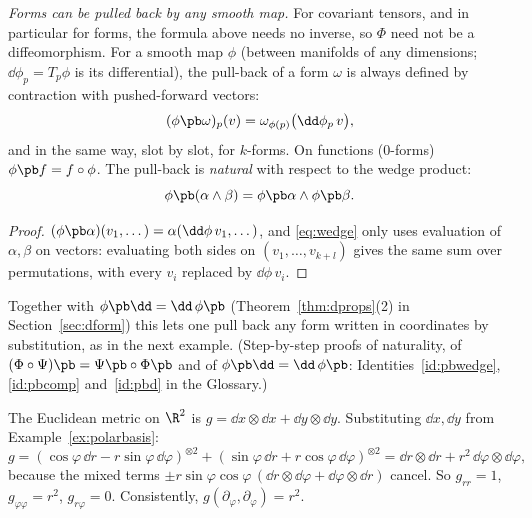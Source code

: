 \emph{Forms can be pulled back by any smooth map.} For covariant tensors, and in particular for forms, the formula above
needs no inverse, so $\Phi$ need not be a diffeomorphism. For a smooth map $\phi$ (between manifolds of any dimensions;
$\dd\phi_p=T_p\phi$ is its differential), the pull-back of a form $\omega$ is always defined by contraction with pushed-forward vectors:
\begin{equation}\label{eq:pullback}
(\phi\pb\omega)_p(v)=\omega_{\phi(p)}\bigl(\dd\phi_p\,v\bigr),
\end{equation}
and in the same way, slot by slot, for $k$-forms. On functions ($0$-forms) $\phi\pb f=f\circ\phi$. The pull-back is
\emph{natural} with respect to the wedge product:
\[
\phi\pb(\alpha\wedge\beta)=\phi\pb\alpha\wedge\phi\pb\beta .
\]
\begin{proof}
$(\phi\pb\alpha)(v_1,\dots)=\alpha(\dd\phi\,v_1,\dots)$, and \eqref{eq:wedge} only uses evaluation of $\alpha,\beta$ on
vectors: evaluating both sides on $(v_1,\dots,v_{k+l})$ gives the same sum over permutations, with every $v_i$ replaced by $\dd\phi\,v_i$.
\end{proof}
Together with $\phi\pb\dd=\dd\,\phi\pb$ (Theorem~\ref{thm:dprops}(2) in Section~\ref{sec:dform}) this lets one pull back any form written in coordinates by
substitution, as in the next example. (Step-by-step proofs of naturality, of $(\Phi\circ\Psi)\pb=\Psi\pb\circ\Phi\pb$ and of
$\phi\pb\dd=\dd\,\phi\pb$: Identities~\ref{id:pbwedge}, \ref{id:pbcomp} and~\ref{id:pbd} in the Glossary.)%

\begin{example}\label{ex:polarmetric}
The Euclidean metric on $\R^2$ is $g=\dd x\otimes\dd x+\dd y\otimes\dd y$. Substituting $\dd x,\dd y$ from Example~\ref{ex:polarbasis}:
\[
g=(\cos\varphi\,\dd r-r\sin\varphi\,\dd\varphi)^{\otimes2}+(\sin\varphi\,\dd r+r\cos\varphi\,\dd\varphi)^{\otimes2}
=\dd r\otimes\dd r+r^2\,\dd\varphi\otimes\dd\varphi ,
\]
because the mixed terms $\pm r\sin\varphi\cos\varphi\,(\dd r\otimes\dd\varphi+\dd\varphi\otimes\dd r)$ cancel. So $g_{rr}=1$, $g_{\varphi\varphi}=r^2$, $g_{r\varphi}=0$. Consistently, $g(\partial_\varphi,\partial_\varphi)=r^2$.
\end{example}


